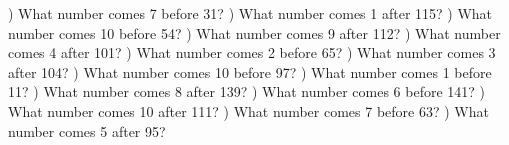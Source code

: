 \documentclass{article}%
\begin{document}
\newline%
) What number comes 7 before 31?%
\newline%
\newline%
) What number comes 1 after 115?%
\newline%
\newline%
) What number comes 10 before 54?%
\newline%
\newline%
) What number comes 9 after 112?%
\newline%
\newline%
) What number comes 4 after 101?%
\newline%
\newline%
) What number comes 2 before 65?%
\newline%
\newline%
) What number comes 3 after 104?%
\newline%
\newline%
) What number comes 10 before 97?%
\newline%
\newline%
) What number comes 1 before 11?%
\newline%
\newline%
) What number comes 8 after 139?%
\newline%
\newline%
) What number comes 6 before 141?%
\newline%
\newline%
) What number comes 10 after 111?%
\newline%
\newline%
) What number comes 7 before 63?%
\newline%
\newline%
) What number comes 5 after 95?%
\newline%
\end{document}
